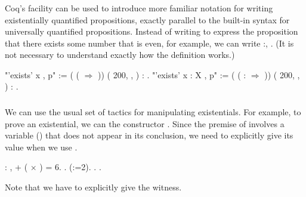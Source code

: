 \documentclass[12pt]{report}
\begin{document}
\subsubsection{ }

 Coq's  facility can be used to introduce more
    familiar notation for writing existentially quantified
    propositions, exactly parallel to the built-in syntax for
    universally quantified propositions.  Instead of writing  
     to express the proposition that there exists some number that
    is even, for example, we can write \coqdoctac{\ensuremath{\exists}} :,  .  (It is
    not necessary to understand exactly how the  definition
    works.) \begin{coqdoccode}
\coqdocemptyline
\coqdocnoindent
{} "'exists' x , p" := ( \coqdocvar{\_} (  \ensuremath{\Rightarrow} ))\coqdoceol
\coqdocindent{1.00em}
(  200,  ,  ) : .\coqdoceol
\coqdocnoindent
{} "'exists' x : X , p" := ( \coqdocvar{\_} ( : \ensuremath{\Rightarrow} ))\coqdoceol
\coqdocindent{1.00em}
(  200,  ,  ) : .\coqdoceol
\coqdocemptyline
\end{coqdoccode}
\subsubsection{ }

 We can use the usual set of tactics for
    manipulating existentials.  For example, to prove an
    existential, we can  the constructor .  Since the
    premise of  involves a variable () that does
    not appear in its conclusion, we need to explicitly give its value
    when we use . \begin{coqdoccode}
\coqdocemptyline
\coqdocnoindent
{}  : \coqdoctac{\ensuremath{\exists}} ,  + ( \ensuremath{\times} ) = 6.\coqdoceol
\coqdocnoindent
{}.\coqdoceol
\coqdocindent{1.00em}
   (:=2).\coqdoceol
\coqdocindent{1.00em}
. .\coqdoceol
\coqdocemptyline
\end{coqdoccode}
Note that we have to explicitly give the witness. 
\end{document}
